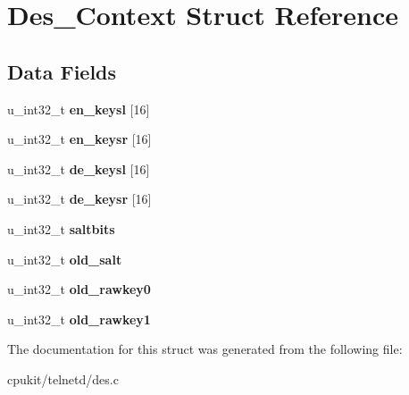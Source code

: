 \hypertarget{structDes__Context}{}\section{Des\+\_\+\+Context Struct Reference}
\label{structDes__Context}
\subsection*{Data Fields}
\begin{DoxyCompactItemize}
\item 
\mbox{\label{structDes__Context_afbf55c32061897ed0f0fb2d3d1209c96}} 
u\+\_\+int32\+\_\+t {\bfseries en\+\_\+keysl} \mbox{[}16\mbox{]}
\item 
\mbox{\label{structDes__Context_acac65c58884f5aefd3f3b6dba2eed657}} 
u\+\_\+int32\+\_\+t {\bfseries en\+\_\+keysr} \mbox{[}16\mbox{]}
\item 
\mbox{\label{structDes__Context_af9d206bb3dba2f7da0f3ecbef34cc91f}} 
u\+\_\+int32\+\_\+t {\bfseries de\+\_\+keysl} \mbox{[}16\mbox{]}
\item 
\mbox{\label{structDes__Context_ae5871f6008ee16ae06abf607a17280d7}} 
u\+\_\+int32\+\_\+t {\bfseries de\+\_\+keysr} \mbox{[}16\mbox{]}
\item 
\mbox{\label{structDes__Context_a71a95398e9ee5eb9cea7dff62de463fd}} 
u\+\_\+int32\+\_\+t {\bfseries saltbits}
\item 
\mbox{\label{structDes__Context_a6010065792fa13d61ffecf1e1646297b}} 
u\+\_\+int32\+\_\+t {\bfseries old\+\_\+salt}
\item 
\mbox{\label{structDes__Context_a10611b4d38d3f309e71057497347c04f}} 
u\+\_\+int32\+\_\+t {\bfseries old\+\_\+rawkey0}
\item 
\mbox{\label{structDes__Context_a9485f6ef526ce2b7bc7526bf5c6e9c13}} 
u\+\_\+int32\+\_\+t {\bfseries old\+\_\+rawkey1}
\end{DoxyCompactItemize}


The documentation for this struct was generated from the following file\+:\begin{DoxyCompactItemize}
\item 
cpukit/telnetd/des.\+c\end{DoxyCompactItemize}
